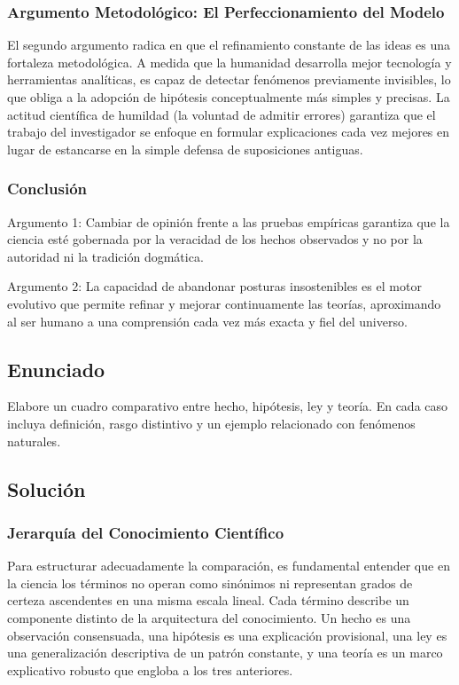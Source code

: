 \documentclass[12pt, a4paper]{article}
\begin{document}
\subsubsection*{Argumento Metodológico: El Perfeccionamiento del Modelo}
El segundo argumento radica en que el refinamiento constante de las ideas es una fortaleza metodológica. A medida que la humanidad desarrolla mejor tecnología y herramientas analíticas, es capaz de detectar fenómenos previamente invisibles, lo que obliga a la adopción de hipótesis conceptualmente más simples y precisas. La actitud científica de humildad (la voluntad de admitir errores) garantiza que el trabajo del investigador se enfoque en formular explicaciones cada vez mejores en lugar de estancarse en la simple defensa de suposiciones antiguas.

\subsubsection*{Conclusión}
Argumento 1: Cambiar de opinión frente a las pruebas empíricas garantiza que la ciencia esté gobernada por la veracidad de los hechos observados y no por la autoridad ni la tradición dogmática.

Argumento 2: La capacidad de abandonar posturas insostenibles es el motor evolutivo que permite refinar y mejorar continuamente las teorías, aproximando al ser humano a una comprensión cada vez más exacta y fiel del universo.

\newpage

\subsection*{Enunciado}
Elabore un cuadro comparativo entre hecho, hipótesis, ley y teoría. En cada caso incluya definición, rasgo distintivo y un ejemplo relacionado con fenómenos naturales.

\subsection*{Solución}

\subsubsection*{Jerarquía del Conocimiento Científico}
Para estructurar adecuadamente la comparación, es fundamental entender que en la ciencia los términos no operan como sinónimos ni representan grados de certeza ascendentes en una misma escala lineal. Cada término describe un componente distinto de la arquitectura del conocimiento. Un hecho es una observación consensuada, una hipótesis es una explicación provisional, una ley es una generalización descriptiva de un patrón constante, y una teoría es un marco explicativo robusto que engloba a los tres anteriores.
\end{document}
